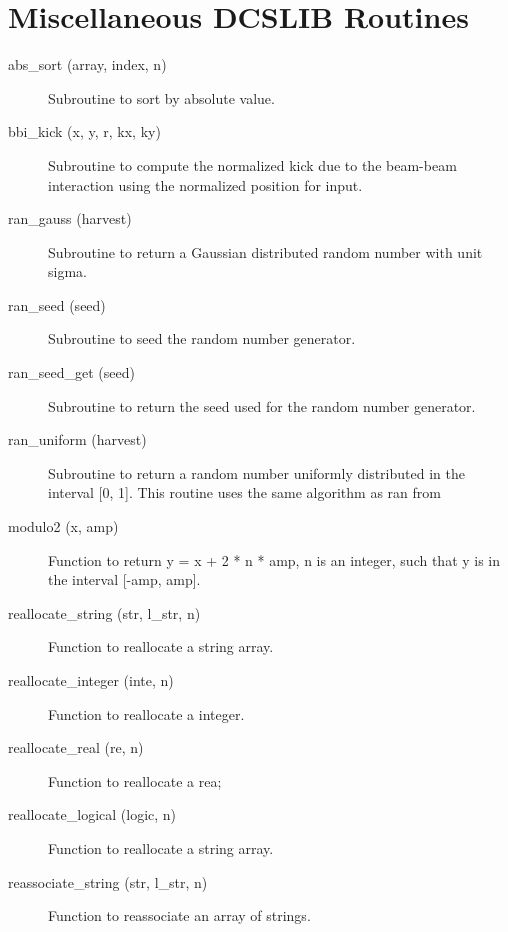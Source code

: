 \section{Miscellaneous DCSLIB Routines}
\label{r:dcs_misc}      

\begin{description}

\item[abs\_sort (array, index, n)] \Newline 
  Subroutine to sort by absolute value.

\item[bbi\_kick (x, y, r, kx, ky)] \Newline 
Subroutine to compute the normalized kick due to the beam-beam
interaction using the normalized position for input.

\item[ran\_gauss (harvest)] \Newline 
Subroutine to return a Gaussian distributed random number with unit sigma.

\item[ran\_seed (seed)] \Newline 
Subroutine to seed the random number generator. 

\item[ran\_seed\_get (seed)] \Newline 
Subroutine to return the seed used for the random number generator.

\item[ran\_uniform (harvest)] \Newline 
Subroutine to return a random number uniformly distributed in the 
interval [0, 1]. This routine uses the same algorithm as ran from

\item[modulo2 (x, amp)] \Newline 
Function to return y = x + 2 * n * amp, n is an integer, such that y is 
in the interval [-amp, amp].

\item[reallocate\_string (str, l\_str, n)] \Newline 
Function to reallocate a string array.

\item[reallocate\_integer (inte, n)] \Newline 
Function to reallocate a integer.

\item[reallocate\_real (re, n)] \Newline 
Function to reallocate a rea;

\item[reallocate\_logical (logic, n)] \Newline 
Function to reallocate a string array.

\item[reassociate\_string (str, l\_str, n)] \Newline 
Function to reassociate an array of strings.


\end{description}
